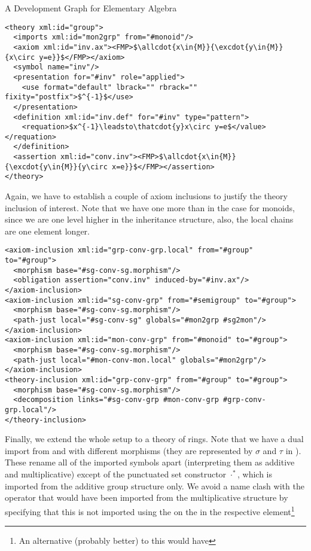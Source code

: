 \begin{omgroup}[id=dg-elal]{A Development Graph for Elementary Algebra}
\begin{lstlisting}[mathescape]
<theory xml:id="group">
  <imports xml:id="mon2grp" from="#monoid"/>
  <axiom xml:id="inv.ax"><FMP>$\allcdot{x\in{M}}{\excdot{y\in{M}}{x\circ y=e}}$</FMP></axiom>
  <symbol name="inv"/>
  <presentation for="#inv" role="applied">
    <use format="default" lbrack="" rbrack="" fixity="postfix">$^{-1}$</use>
  </presentation>
  <definition xml:id="inv.def" for="#inv" type="pattern">
    <requation>$x^{-1}\leadsto\thatcdot{y}x\circ y=e$</value></requation>
  </definition>
  <assertion xml:id="conv.inv"><FMP>$\allcdot{x\in{M}}{\excdot{y\in{M}}{y\circ x=e}}$</FMP></assertion>
</theory>
\end{lstlisting}
Again, we have to establish a couple of axiom inclusions to justify the theory
inclusion of interest. Note that we have one more than in the case for monoids,
since we are one level higher in the inheritance structure, also, the local chains
are one element longer.
\begin{lstlisting}[mathescape,index={axiom-inclusion,theory-inclusion}]
<axiom-inclusion xml:id="grp-conv-grp.local" from="#group" to="#group">
  <morphism base="#sg-conv-sg.morphism"/>
  <obligation assertion="conv.inv" induced-by="#inv.ax"/>
</axiom-inclusion>
<axiom-inclusion xml:id="sg-conv-grp" from="#semigroup" to="#group">
  <morphism base="#sg-conv-sg.morphism"/>
  <path-just local="#sg-conv-sg" globals="#mon2grp #sg2mon"/>
</axiom-inclusion>
<axiom-inclusion xml:id="mon-conv-grp" from="#monoid" to="#group">
  <morphism base="#sg-conv-sg.morphism"/>
  <path-just local="#mon-conv-mon.local" globals="#mon2grp"/>
</axiom-inclusion>
<theory-inclusion xml:id="grp-conv-grp" from="#group" to="#group">
  <morphism base="#sg-conv-sg.morphism"/>
  <decomposition links="#sg-conv-grp #mon-conv-grp #grp-conv-grp.local"/>
</theory-inclusion>
\end{lstlisting}
Finally, we extend the whole setup to a theory of rings. Note that we have a dual import
from {} and {} with different morphisms (they are
represented by $\sigma$ and $\tau$ in {}). These rename all of the
imported symbols apart (interpreting them as additive and multiplicative) except of the
punctuated set constructor $\cdot^*$, which is imported from the additive group structure
only. We avoid a name clash with the operator that would have been imported from the
multiplicative structure by specifying that this is not imported using the
{} on the {} in the respective
{} element\footnote{An alternative (probably better) to this would have
}
\end{omgroup}
